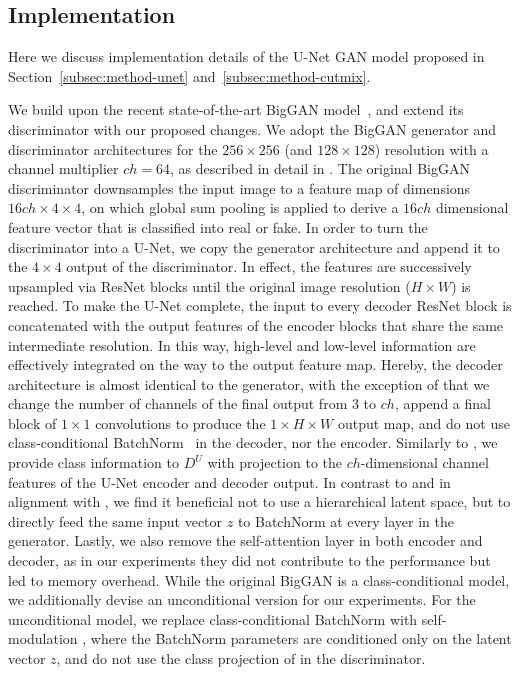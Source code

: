 \documentclass[10pt,twocolumn,letterpaper]{article}
\makeatletter
\renewcommand{\paragraph}{\@startsection{paragraph}{4}{\z@}{0.5ex plus 0.8ex minus .5ex}{-0.5em}{\normalsize\bf}}
\let\originalparagraph\paragraph
\renewcommand{\paragraph}[2][.]{\originalparagraph{#2#1}}
\makeatother
\begin{document}
\subsection{Implementation}
Here we discuss implementation details of the U-Net GAN model proposed in Section~\ref{subsec:method-unet} and~\ref{subsec:method-cutmix}.

\paragraph{U-Net based discriminator}
We build upon the recent state-of-the-art BigGAN model~\cite{Brock2019}, and extend its discriminator with our proposed changes.
We adopt the BigGAN generator and discriminator architectures for the $256\times 256$ (and $128\times 128$) resolution with a channel multiplier $ch=64$, as described in detail in \cite{Brock2019}. The original BigGAN discriminator downsamples the input image to a feature map of dimensions $16ch\times 4\times 4$, on which global sum pooling is applied to derive a $16ch$ dimensional feature vector that is classified into real or fake. In order to turn the discriminator into a U-Net, we copy the generator architecture and append it to the $4\times4$ output of the discriminator.
In effect, the features are successively upsampled via ResNet blocks until the original image resolution ($H\times W$) is reached. To make the U-Net complete, the input to every decoder ResNet block is concatenated with the output features of the encoder blocks that share the same intermediate resolution. In this way, high-level and low-level information are effectively integrated on the way to the output feature map.
Hereby, the decoder architecture is almost identical to the generator, with the exception of that we change the number of channels of the final output from $3$ to $ch$, append a final block of $1\times1$ convolutions to produce the $1\times H\times W$ output map, and do not use class-conditional BatchNorm~\cite{Vries2017ModulatingEV,Dumoulin2016ALR} in the decoder, nor the encoder.
Similarly to \cite{Brock2019}, we provide class information to $D^U$ with projection \cite{miyato2018cgans} to the $ch$-dimensional channel features
of the U-Net encoder and decoder output.
In contrast to \cite{Brock2019} and in alignment with \cite{Chen2018OnSM}, we find it beneficial not to use a hierarchical latent space, but to directly feed the same input vector $z$ to BatchNorm at every layer in the generator.
Lastly, we also remove the self-attention layer in both encoder and decoder, as in our experiments they did not contribute to the performance but led to memory overhead.
While the original BigGAN is a class-conditional model, we additionally devise an unconditional version for our experiments. For the unconditional model, we replace class-conditional BatchNorm with self-modulation \cite{Chen2018OnSM}, where the BatchNorm parameters are conditioned only on the latent vector $z$, and do not use the class projection of \cite{miyato2018cgans} in the discriminator.
\end{document}
